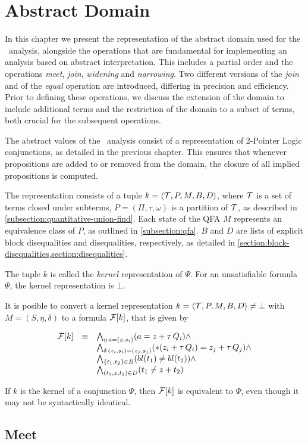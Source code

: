 \chapter{Abstract Domain}

In this chapter we present the representation of the abstract domain used for the \cpo\ analysis, alongside the operations that are fundamental for implementing an analysis based on abstract interpretation.
This includes a partial order and the operations \emph{meet}, \emph{join}, \emph{widening} and \emph{narrowing}.
Two different versions of the \emph{join} and of the \emph{equal} operation are introduced,
differing in precision and efficiency.
Prior to defining these operations, we discuss the extension of the domain to include additional terms and the restriction of the domain to a subset of terms,
both crucial for the subsequent operations.

The abstract values of the \cpo\ analysis consist of a representation
of 2-Pointer Logic conjunctions, as detailed in the previous chapter.
This ensures that whenever propositions are added to or removed from the domain,
the closure of all implied propositions is computed.

The representation consists of a tuple $k = \langle\mathcal{T},P,M,B,D\rangle$,
where $\mathcal{T}$ is a set of terms closed under subterms, $P = (\Pi, \tau, \omega)$ is a partition
of $\mathcal{T}$, as described in \cref{subsection:quantitative-union-find}.
Each state of the QFA $M$ represents an equivalence class of $P$, as outlined in \cref{subsection:qfa}.
$B$ and $D$ are lists of explicit block disequalities and disequalities, respectively, as detailed in \cref{section:block-disequalities,section:disequalities}.

The tuple $k$ is called the \emph{kernel} representation of $\Psi$.
For an unsatisfiable formula $\Psi$, the kernel representation is $\bot$.

It is posible to convert a kernel representation $k = \langle\mathcal{T},P,M,B,D\rangle \neq \bot$ with $M = (S, \eta, \delta)$ to a formula $\mathcal{F}[k]$, that is given by

\[
\begin{array}{lll}
    \mathcal{F}[k] & \equiv & \bigwedge_{\eta\,a=(z,s_i)} (a = z + \tau\,Q_i) \land \\
    & & \bigwedge_{\delta\,(z_i,s_i)=(z_j,s_j)} (*(z_i + \tau\,Q_i) = z_j + \tau\,Q_j) \land \\
    & & \bigwedge_{\{t_1, t_2\} \in B} (bl(t_1) \neq bl(t_2)) \land \\
    & & \bigwedge_{(t_1, z, t_2) \in D} (t_1 \neq z + t_2)
\end{array}
\]

If $k$ is the kernel of a conjunction $\Psi$, then $\mathcal{F}[k]$ is equivalent to $\Psi$,
even though it may not be syntactically identical.





\section{Meet}




